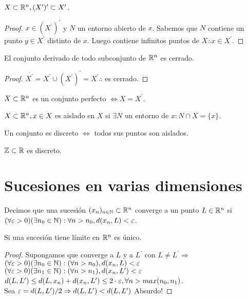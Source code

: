 \begin{prop}
  $X \subset \mathbb{R}^n, (X^{\prime})^{\prime} \subset X^{\prime}$.
  \begin{proof}
    $x \in (X^{\prime})^{\prime}$ y $N$ un entorno abierto de $x$. Sabemos que $N$ contiene un punto $y \in X^{\prime}$ distinto de $x$. Luego contiene infinitos puntos de $X \therefore x \in X^{\prime}$.
  \end{proof}
\end{prop}

\begin{corollary}
  El conjunto derivado de todo subconjunto de $\mathbb{R}^n$ es cerrado.
  \begin{proof}
    $\overline{X^{\prime}} = X^{\prime} \cup (X^{\prime})^{\prime} = X^{\prime} \therefore$ es cerrado.
  \end{proof}
\end{corollary}

\begin{definition}
  $X \subset \mathbb{R}^n$ es un conjunto perfecto $\iff X = X^{\prime}$.
\end{definition}

\begin{definition}
  $X \subset \mathbb{R}^n, x \in X$ es aislado en $X$ si $\exists N$ un entorno de $x : N \cap X = \{x\}$.
\end{definition}

\begin{definition}
  Un conjunto es discreto $\iff$ todos sus puntos son aislados.
\end{definition}

\begin{eg}
  $\mathbb{Z} \subset \mathbb{R}$ es discreto.
\end{eg}

\section{Sucesiones en varias dimensiones}

Decimos que una sucesión $(x_n)_{n \in \mathbb{N}} \subset \mathbb{R}^n$ converge a un punto $L \in \mathbb{R}^n$ si $(\forall \varepsilon > 0)(\exists n_0 \in \mathbb{N}) : \forall n > n_0, d(x_n, L) < \varepsilon$.

\begin{lemma}
  Si una sucesión tiene límite en $\mathbb{R}^n$ es único.
  \begin{proof}
    Supongamos que converge a $L$ y a $L^{\prime}$ con $L \neq L^{\prime} \Rightarrow$ \\
    $(\forall \varepsilon > 0)(\exists n_0 \in \mathbb{N}) : (\forall n > n_0), d(x_n, L) < \varepsilon$ \\
    $(\forall \varepsilon > 0)(\exists n_1 \in \mathbb{N}) : (\forall n > n_1), d(x_n, L^{\prime}) < \varepsilon$ \\
    $d(L, L^{\prime}) \leq d(L, x_n) + d(x_n, L^{\prime}) \leq 2 \cdot \varepsilon, \forall n > max(n_0, n_1)$. \\
    Sea $\varepsilon = d(L, L^{\prime})/2 \Rightarrow d(L, L^{\prime}) < d(L, L^{\prime})$ Absurdo!
  \end{proof}
\end{lemma}

